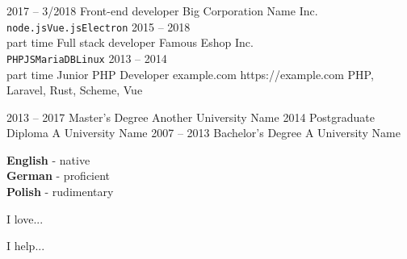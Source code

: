 \documentclass[9pt]{../template/developercv}
\begin{document}

\begin{entrylist}
    \entry
        {2017 -- 3/2018}
        {Front-end developer}
        {Big Corporation Name Inc.}
        {}
        {}
        {\lorem \lorem \lorem\\ \texttt{node.js}\slashsep\texttt{Vue.js}\slashsep\texttt{Electron}}
    \entry
        {2015 -- 2018\\\footnotesize{part time}}
        {Full stack developer}
        {Famous Eshop Inc.}
        {}
        {}
        {\lorem\lorem\\ \texttt{PHP}\slashsep\texttt{JS}\slashsep\texttt{MariaDB}\slashsep\texttt{Linux}}
    \entry
        {2013 -- 2014\\{\footnotesize part time }}
        {Junior PHP Developer}
        {example.com}
        {https://example.com}
        {PHP, Laravel, Rust, Scheme, Vue}
        {\lorem\lorem}
\end{entrylist}



\begin{entrylist}
    \entry
        {2013 -- 2017}
        {Master's Degree}
        {Another University Name}
        {}
        {}
        {\lorem\lorem\lorem}
    \entry
        {2014}
        {Postgraduate Diploma}
        {A University Name}
        {}
        {}
        {\lorem\lorem}
    \entry
        {2007 -- 2013}
        {Bachelor's Degree}
        {A University Name}
        {}
        {}
        {\lorem\lorem}
\end{entrylist}


\begin{minipage}[t]{0.3\textwidth}
    \vspace{-\baselineskip}
    \textbf{English} - native\\
    \textbf{German} - proficient\\
    \textbf{Polish} - rudimentary
\end{minipage}
%
\hfill
\begin{minipage}[t]{0.3\textwidth}
    \vspace{-\baselineskip}
    I love... \lorem
\end{minipage}
%
\hfill
\begin{minipage}[t]{0.3\textwidth}
    \vspace{-\baselineskip}
    I help... \lorem
\end{minipage}
\end{document}
